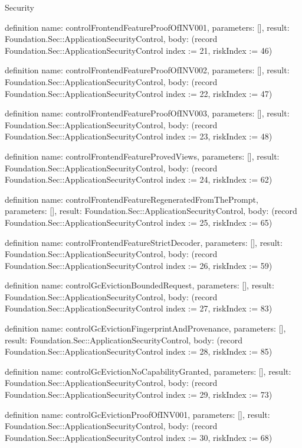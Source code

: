 \begin{lexlean}{Security}
\begin{semanticmodule}
definition{
  name: controlFrontendFeatureProofOfINV001,
  parameters: [],
  result: Foundation.Sec::ApplicationSecurityControl,
  body: (record Foundation.Sec::ApplicationSecurityControl {index := 21, riskIndex := 46})
}

definition{
  name: controlFrontendFeatureProofOfINV002,
  parameters: [],
  result: Foundation.Sec::ApplicationSecurityControl,
  body: (record Foundation.Sec::ApplicationSecurityControl {index := 22, riskIndex := 47})
}

definition{
  name: controlFrontendFeatureProofOfINV003,
  parameters: [],
  result: Foundation.Sec::ApplicationSecurityControl,
  body: (record Foundation.Sec::ApplicationSecurityControl {index := 23, riskIndex := 48})
}

definition{
  name: controlFrontendFeatureProvedViews,
  parameters: [],
  result: Foundation.Sec::ApplicationSecurityControl,
  body: (record Foundation.Sec::ApplicationSecurityControl {index := 24, riskIndex := 62})
}

definition{
  name: controlFrontendFeatureRegeneratedFromThePrompt,
  parameters: [],
  result: Foundation.Sec::ApplicationSecurityControl,
  body: (record Foundation.Sec::ApplicationSecurityControl {index := 25, riskIndex := 65})
}

definition{
  name: controlFrontendFeatureStrictDecoder,
  parameters: [],
  result: Foundation.Sec::ApplicationSecurityControl,
  body: (record Foundation.Sec::ApplicationSecurityControl {index := 26, riskIndex := 59})
}

definition{
  name: controlGcEvictionBoundedRequest,
  parameters: [],
  result: Foundation.Sec::ApplicationSecurityControl,
  body: (record Foundation.Sec::ApplicationSecurityControl {index := 27, riskIndex := 83})
}

definition{
  name: controlGcEvictionFingerprintAndProvenance,
  parameters: [],
  result: Foundation.Sec::ApplicationSecurityControl,
  body: (record Foundation.Sec::ApplicationSecurityControl {index := 28, riskIndex := 85})
}

definition{
  name: controlGcEvictionNoCapabilityGranted,
  parameters: [],
  result: Foundation.Sec::ApplicationSecurityControl,
  body: (record Foundation.Sec::ApplicationSecurityControl {index := 29, riskIndex := 73})
}

definition{
  name: controlGcEvictionProofOfINV001,
  parameters: [],
  result: Foundation.Sec::ApplicationSecurityControl,
  body: (record Foundation.Sec::ApplicationSecurityControl {index := 30, riskIndex := 68})
}


\end{semanticmodule}
\end{lexlean}
